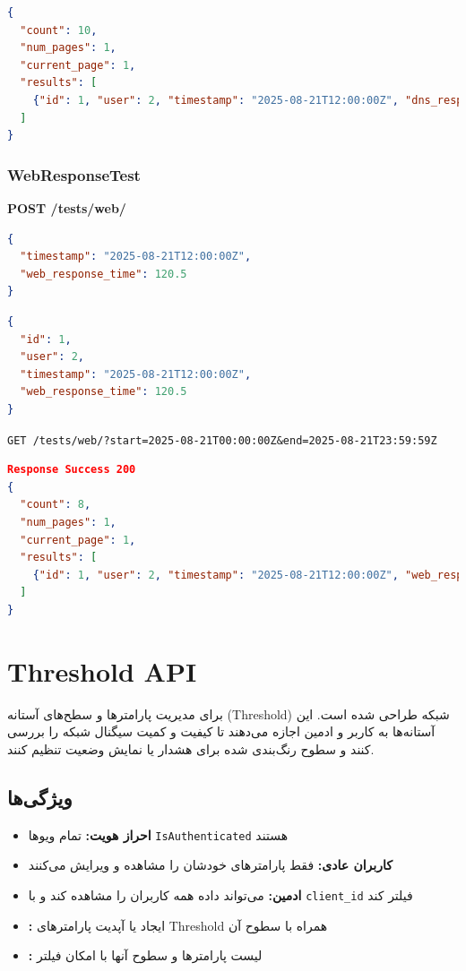 \documentclass{report}
\begin{document}
\begin{lstlisting}[language=json]
{
  "count": 10,
  "num_pages": 1,
  "current_page": 1,
  "results": [
    {"id": 1, "user": 2, "timestamp": "2025-08-21T12:00:00Z", "dns_response_time": 50.2}
  ]
}
\end{lstlisting}

\subsubsection{WebResponseTest}
\textbf{POST /tests/web/}
\begin{lstlisting}[language=json]
{
  "timestamp": "2025-08-21T12:00:00Z",
  "web_response_time": 120.5
}
\end{lstlisting}

\begin{lstlisting}[language=json]
{
  "id": 1,
  "user": 2,
  "timestamp": "2025-08-21T12:00:00Z",
  "web_response_time": 120.5
}
\end{lstlisting}

\begin{center}
	\begin{latin}
\texttt{GET\hspace{1cm} /tests/web/?start=2025-08-21T00:00:00Z\&end=2025-08-21T23:59:59Z}
	\end{latin}
\end{center}

\begin{lstlisting}[language=json]
Response Success 200
{
  "count": 8,
  "num_pages": 1,
  "current_page": 1,
  "results": [
    {"id": 1, "user": 2, "timestamp": "2025-08-21T12:00:00Z", "web_response_time": 120.5}
  ]
}
\end{lstlisting}



\section{Threshold API}
برای مدیریت پارامترها و سطح‌های آستانه (Threshold) شبکه طراحی شده است. این آستانه‌ها به کاربر و ادمین اجازه می‌دهند تا کیفیت و کمیت سیگنال شبکه  را بررسی کنند و سطوح رنگ‌بندی شده برای هشدار یا نمایش وضعیت تنظیم کنند.

\subsection{ویژگی‌ها}
\begin{itemize}
    \item \textbf{احراز هویت:} تمام ویوها \texttt{IsAuthenticated} هستند
    \item \textbf{کاربران عادی:} فقط پارامترهای خودشان را مشاهده و ویرایش می‌کنند
    \item \textbf{ادمین:} می‌تواند داده همه کاربران را مشاهده کند و با \texttt{client\_id} فیلتر کند
    \item \textbf{:} ایجاد یا آپدیت پارامترهای Threshold همراه با سطوح آن
    \item \textbf{:} لیست پارامترها و سطوح آنها با امکان فیلتر
\end{itemize}
\end{document}
